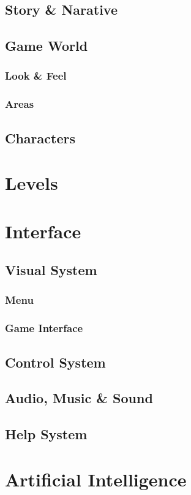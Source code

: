 \documentclass[12pt, letterpaper]{article}
\begin{document}
    \subsection{Story \& Narative}
    \subsection{Game World}
        \subsubsection{Look \& Feel}
        \subsubsection{Areas}
    \subsection{Characters}
\section{Levels}
\section{Interface}
    \subsection{Visual System}
        \subsubsection{Menu}
        \subsubsection{Game Interface}
    \subsection{Control System}
    \subsection{Audio, Music \& Sound}
    \subsection{Help System}
\section{Artificial Intelligence}
\end{document}
